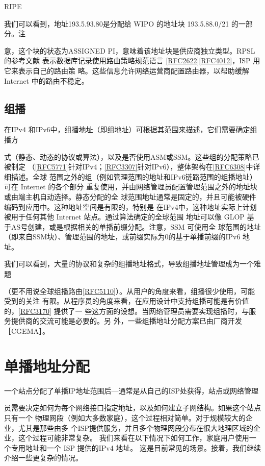 RIPE

我们可以看到，地址193.5.93.80是分配给 WIPO 的地址块 193.5.88.0/21 的一部分。注

意，这个块的状态为ASSIGNED PI，意味着该地址块是供应商独立类型。RPSL 的参考文献
表示数据库记录使用路由策略规范语言 \href{https://www.rfc-editor.org/rfc/rfc2622}{[RFC2622]}\href{https://www.rfc-editor.org/rfc/rfc4012}{[RFC4012]}，ISP 用它来表示自己的路由策
略。这些信息允许网络运营商配置路由器，以帮助缓解 Internet 中的路由不稳定。

\subsection{组播}
在IPv4 和IPv6中，组播地址（即组地址）可根据其范围来描述，它们需要确定组播方

式（静态、动态的协议或算法），以及是否使用ASM或SSM。这些组的分配策略已被制定
（\href{https://www.rfc-editor.org/rfc/rfc5771}{[RFC5771]}针对IPv4；\href{https://www.rfc-editor.org/rfc/rfc3307}{[RFC3307]}针对IPv6），整体架构在\href{https://www.rfc-editor.org/rfc/rfc6308}{[RFC6308]}中详细描述。全球
范围之外的组（例如管理范围的地址和IPv6链路范围的组播地址）可在 Internet 的各个部分
重复使用，并由网络管理员配置管理范围之外的地址块或由端主机自动选择。静态分配的全
球范围地址通常是固定的，并且可能被硬件编码到应用中。这种地址空间是有限的，特别是
在IPv4中，这种地址实际上计划被用于任何其他 Internet 站点。通过算法确定的全球范围
地址可以像 GLOP 基于AS号创建，或是根据相关的单播前缀分配。注意，SSM 可使用全
球范围的地址（即来自SSM块）、管理范围的地址，或前缀实际为0的基于单播前缀的IPv6
地址。

我们可以看到，大量的协议和复杂的组播地址格式，导致组播地址管理成为一个难题

（更不用说全球组播路由\href{https://www.rfc-editor.org/rfc/rfc5110}{[RFC5110]}）。从用户的角度来看，组播很少使用，可能受到的关注
有限。从程序员的角度来看，在应用设计中支持组播可能是有价值的，\href{https://www.rfc-editor.org/rfc/rfc3170}{[RFC3170]} 提供了一
些这方面的设想。当网络管理员需要实现组播时，与服务提供商的交流可能是必要的。另
外，一些组播地址分配方案已由厂商开发［CGEMA］。

\section{单播地址分配}
一个站点分配了单播IP地址范围后—通常是从自己的ISP处获得，站点或网络管理

员需要决定如何为每个网络接口指定地址，以及如何建立子网结构。如果这个站点只有一个
物理网段（例如大多数家庭），这个过程相对简单。对于规模较大的企业，尤其是那些由多
个ISP提供服务，并且多个物理网段分布在很大地理区域的企业，这个过程可能非常复杂。
我们来看在以下情况下如何工作，家庭用户使用一个专用地址和一个 ISP 提供的IPv4 地址。
这是目前常见的场景。接着，我们继续介绍一些更复杂的情况。

